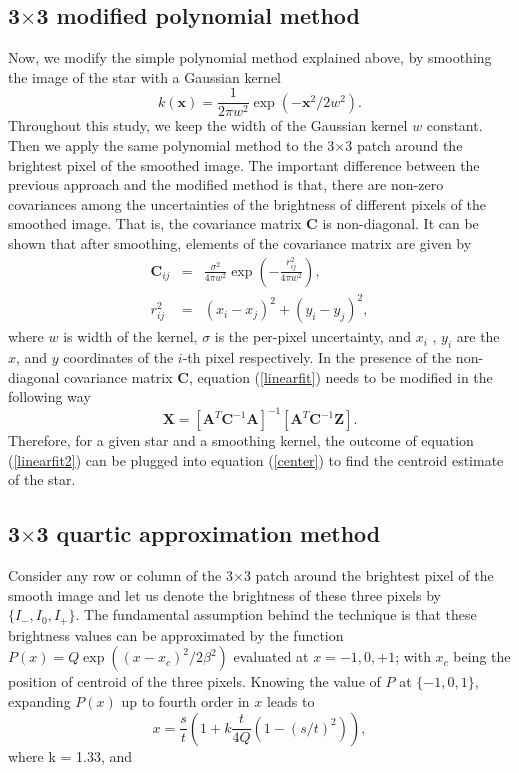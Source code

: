 \documentclass[12pt, preprint]{aastex}
\newcommand{\beq}{\begin{equation}}
\newcommand{\eeq}{\end{equation}}
\begin{document}
\subsection{3$\times$3 modified polynomial method}
Now, we modify the simple polynomial method explained above,
by smoothing the image of the star with a Gaussian kernel
\beq
k(\mathbf{x}) = \frac{1}{2\pi w^2}\exp(-\mathbf{x}^{2}/2w^{2}).
\eeq
Throughout this study, we keep the width of the Gaussian kernel $w$ constant.
Then we apply the same polynomial method to the 3$\times$3 patch around the brightest
pixel of the smoothed image. The important difference between the previous
approach and the modified method is that, there are non-zero covariances
among the uncertainties of the brightness of different pixels of the
smoothed image. That is, the covariance matrix $\mathbf{C}$ is non-diagonal.
It can be shown that after smoothing, elements of the covariance matrix are given by
\begin{eqnarray}
\mathbf{C}_{ij} &=& \frac{\sigma^{2}}{4\pi w^{2}} \exp(-\frac{r_{ij}^{2}}{4\pi w^{2}}),\\
r_{ij}^{2} &=& (x_{i} - x_{j})^{2} + (y_{i} - y_{j})^{2},
\label{nondiagonal}
\end{eqnarray}
where $w$ is width of the kernel, $\sigma$ is the per-pixel uncertainty, and $x_{i}$
, $y_{i}$ are the $x$, and $y$ coordinates of the $i$-th pixel
respectively. In the presence of the non-diagonal covariance matrix
$\mathbf{C}$, equation (\ref{linearfit}) needs to be modified in the following way
\beq
\mathbf{X} = [\mathbf{A}^{T}\mathbf{C}^{-1}\mathbf{A}]^{-1}[\mathbf{A}^{T}\mathbf{C}^{-1}\mathbf{Z}].
\label{linearfit2}
\eeq
Therefore, for a given star and a smoothing kernel,
the outcome of equation (\ref{linearfit2}) can be
plugged into equation (\ref{center}) to find the centroid estimate
of the star.
\subsection{3$\times$3 quartic approximation method}
Consider any row or column of the 3$\times$3 patch around
the brightest pixel of the smooth image and let us denote
the brightness of these three pixels by $\{I_{-},I_{0},I_{+}\}$.
The fundamental assumption behind the technique is that these
brightness values can be approximated
by the function $P(x) = Q\exp((x-x_{c})^{2}/2\beta^{2})$
evaluated at $x=-1,0,+1$; with $x_{c}$ being the position of centroid
of the three pixels. Knowing the value of $P$ at $\{-1,0,1\}$,
expanding $P(x)$ up to fourth order in $x$ leads to
\beq
x = \frac{s}{t}(1+k\frac{t}{4Q}(1-(s/t)^{2})),
\eeq
where k = 1.33, and
\end{document}
